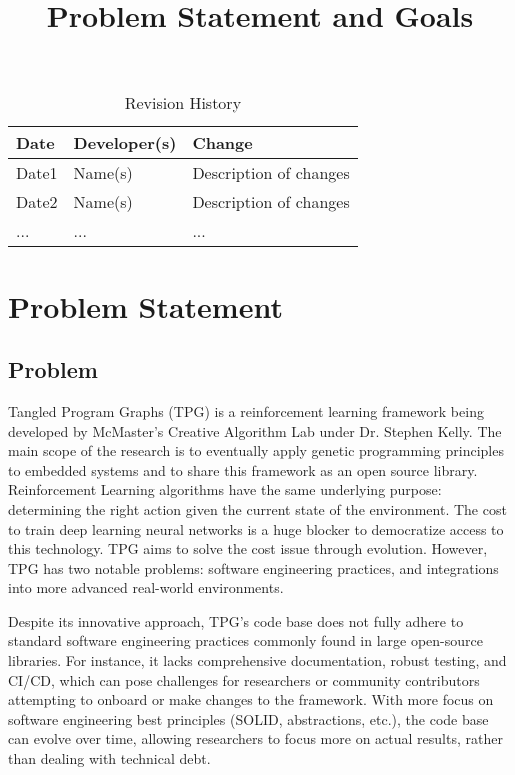 \documentclass{article}
\title{Problem Statement and Goals\\\progname}
\author{\authname}
\date{}
\begin{document}
\maketitle

\begin{table}[hp]
\caption{Revision History} \label{TblRevisionHistory}
\begin{tabularx}{\textwidth}{llX}
\toprule
\textbf{Date} & \textbf{Developer(s)} & \textbf{Change}\\
\midrule
Date1 & Name(s) & Description of changes\\
Date2 & Name(s) & Description of changes\\
... & ... & ...\\
\bottomrule
\end{tabularx}
\end{table}

\section{Problem Statement}

\subsection{Problem}

Tangled Program Graphs (TPG) is a reinforcement learning framework being developed by McMaster’s Creative Algorithm Lab under Dr. Stephen Kelly. The main scope of the research is to eventually apply genetic programming principles to embedded systems and to share this framework as an open source library. Reinforcement Learning algorithms have the same underlying purpose: determining the right action given the current state of the environment. The cost to train deep learning neural networks is a huge blocker to democratize access to this technology. TPG aims to solve the cost issue through evolution. However, TPG has two notable problems: software engineering practices, and integrations into more advanced real-world environments.

Despite its innovative approach, TPG’s code base does not fully adhere to standard software engineering practices commonly found in large open-source libraries. For instance, it lacks comprehensive documentation, robust testing, and CI/CD, which can pose challenges for researchers or community contributors attempting to onboard or make changes to the framework. With more focus on software engineering best principles (SOLID, abstractions, etc.), the code base can evolve over time, allowing researchers to focus more on actual results, rather than dealing with technical debt.
\end{document}
